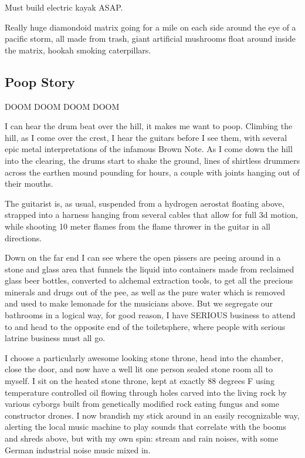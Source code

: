 Must build electric kayak ASAP.

Really huge diamondoid matrix going for a mile on each side around the
eye of a pacific storm, all made from trash, giant artificial mushrooms
float around inside the matrix, hookah smoking caterpillars.

\subsection{Poop Story}\label{poop-story}

DOOM DOOM DOOM DOOM

I can hear the drum beat over the hill, it makes me want to poop.
Climbing the hill, as I come over the crest, I hear the guitars before I
see them, with several epic metal interpretations of the infamous Brown
Note. As I come down the hill into the clearing, the drums start to
shake the ground, lines of shirtless drummers across the earthen mound
pounding for hours, a couple with joints hanging out of their mouths.

The guitarist is, as usual, suspended from a hydrogen aerostat floating
above, strapped into a harness hanging from several cables that allow
for full 3d motion, while shooting 10 meter flames from the flame
thrower in the guitar in all directions.

Down on the far end I can see where the open pissers are peeing around
in a stone and glass area that funnels the liquid into containers made
from reclaimed glass beer bottles, converted to alchemal extraction
tools, to get all the precious minerals and drugs out of the pee, as
well as the pure water which is removed and used to make lemonade for
the musicians above. But we segregate our bathrooms in a logical way,
for good reason, I have SERIOUS business to attend to and head to the
opposite end of the toiletsphere, where people with serious latrine
business must all go.

I choose a particularly awesome looking stone throne, head into the
chamber, close the door, and now have a well lit one person sealed stone
room all to myself. I sit on the heated stone throne, kept at exactly 88
degrees F using temperature controlled oil flowing through holes carved
into the living rock by various cyborgs built from genetically modified
rock eating fungus and some constructor drones. I now brandish my stick
around in an easily recognizable way, alerting the local music machine
to play sounds that correlate with the booms and shreds above, but with
my own spin: stream and rain noises, with some German industrial noise
music mixed in.

